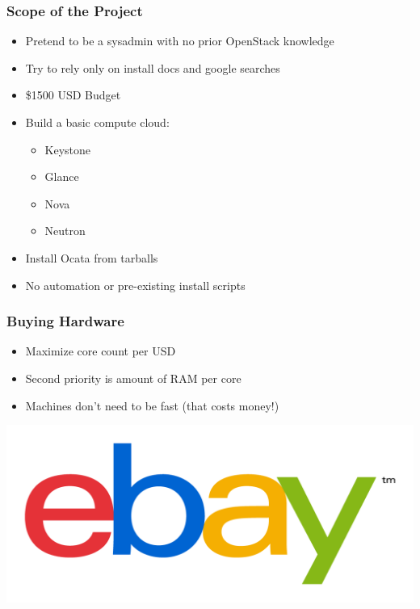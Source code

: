 \documentclass[aspectratio=169,11pt,hyperref={colorlinks=true}]{beamer}
\begin{document}
\begin{frame}
\frametitle{Scope of the Project}
    \begin{itemize}
        \item Pretend to be a sysadmin with no prior OpenStack knowledge
        \item Try to rely only on install docs and google searches
        \item \$1500 USD Budget
        \item Build a basic compute cloud:
        \begin{itemize}
            \item Keystone
            \item Glance
            \item Nova
            \item Neutron
        \end{itemize}
        \item Install Ocata from tarballs
        \item No automation or pre-existing install scripts
    \end{itemize}
\end{frame}

\begin{frame}
\frametitle{Buying Hardware}
    \begin{itemize}
        \item Maximize core count per USD
        \item Second priority is amount of RAM per core
        \item Machines don't need to be fast (that costs money!)
    \end{itemize}
\end{frame}

\begin{frame}
    \includegraphics[width=\textwidth]{EBay_logo.png}
\end{frame}
\end{document}
